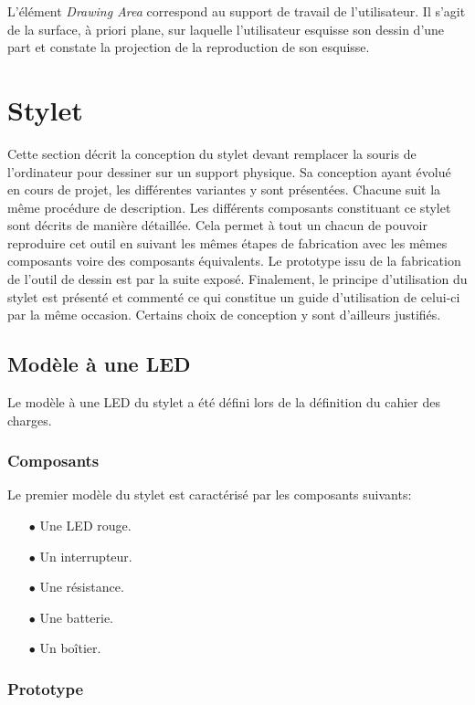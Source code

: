 \documentclass[11pt,a4paper,oldfontcommands]{memoir}
\begin{document}
L'élément \textit{Drawing Area} correspond au support de travail de l'utilisateur. Il s'agit de la surface, à priori plane, sur laquelle l'utilisateur esquisse son dessin d'une part et constate la projection de la reproduction de son esquisse.

\section{Stylet}

Cette section décrit la conception du stylet devant remplacer la souris de l'ordinateur pour dessiner sur un support physique. Sa conception ayant évolué en cours de projet, les différentes variantes y sont présentées. Chacune suit la même procédure de description. Les différents composants constituant ce stylet sont décrits de manière détaillée. Cela permet à tout un chacun de pouvoir reproduire cet outil en suivant les mêmes étapes de fabrication avec les mêmes composants voire des composants équivalents. Le prototype issu de la fabrication de l'outil de dessin est par la suite exposé. Finalement, le principe d'utilisation du stylet est présenté et commenté ce qui constitue un guide d'utilisation de celui-ci par la même occasion. Certains choix de conception y sont d'ailleurs justifiés.

\subsection{Modèle à une LED}

Le modèle à une LED du stylet a été défini lors de la définition du cahier des charges.

\subsubsection{Composants}

Le premier modèle du stylet est caractérisé par les composants suivants:

\begin{itemize}
\item[$\bullet$] Une LED rouge.
\item[$\bullet$] Un interrupteur.
\item[$\bullet$] Une résistance.
\item[$\bullet$] Une batterie.
\item[$\bullet$] Un boîtier.
\end{itemize}

\subsubsection{Prototype}
\end{document}
